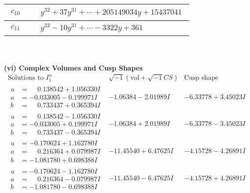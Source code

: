 \documentclass[1p]{elsarticle_modified}
\theoremstyle{definition}
\newcommand{\I}{\sqrt{-1}}
\begin{document}
\begin{tabular}{m{50pt}|m{274pt}}
\hline $$\begin{aligned}c_{10}\end{aligned}$$&$\begin{aligned}
&y^{32}+37 y^{31}+\cdots+205149034 y+15437041
\end{aligned}$\\
\hline $$\begin{aligned}c_{11}\end{aligned}$$&$\begin{aligned}
&y^{32}-10 y^{31}+\cdots-3322 y+361
\end{aligned}$\\
\hline
\end{tabular}\\~\\
\newpage\flushleft \textbf{(vi) Complex Volumes and Cusp Shapes}
$$\begin{array}{c|c|c}  
\text{Solutions to }I^u_{1}& \I (\text{vol} + \sqrt{-1}CS) & \text{Cusp shape}\\
 \hline 
\begin{aligned}
u &= \phantom{-}0.138542 + 1.056330 I \\
a &= -0.033005 - 0.199971 I \\
b &= \phantom{-}0.733437 + 0.365394 I\end{aligned}
 & -1.06384 - 2.01989 I & -6.33778 + 3.45023 I \\ \hline\begin{aligned}
u &= \phantom{-}0.138542 - 1.056330 I \\
a &= -0.033005 + 0.199971 I \\
b &= \phantom{-}0.733437 - 0.365394 I\end{aligned}
 & -1.06384 + 2.01989 I & -6.33778 - 3.45023 I \\ \hline\begin{aligned}
u &= -0.170624 + 1.162780 I \\
a &= \phantom{-}0.216364 + 0.079987 I \\
b &= -1.081780 + 0.698388 I\end{aligned}
 & -11.45540 + 6.47625 I & -4.15728 - 4.26891 I \\ \hline\begin{aligned}
u &= -0.170624 - 1.162780 I \\
a &= \phantom{-}0.216364 - 0.079987 I \\
b &= -1.081780 - 0.698388 I\end{aligned}
 & -11.45540 - 6.47625 I & -4.15728 + 4.26891 I \\ \hline\begin{aligned}

\end{aligned}
\end{array}$$
\end{document}

